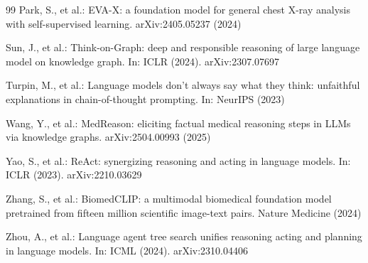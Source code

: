 \documentclass[runningheads]{llncs}
\begin{document}
\begin{thebibliography}{99}
Park, S., et al.:
EVA-X: a foundation model for general chest X-ray analysis with
self-supervised learning.
arXiv:2405.05237 (2024)

Sun, J., et al.:
Think-on-Graph: deep and responsible reasoning of large language model
on knowledge graph.
In: ICLR (2024). arXiv:2307.07697

Turpin, M., et al.:
Language models don't always say what they think: unfaithful explanations
in chain-of-thought prompting.
In: NeurIPS (2023)

Wang, Y., et al.:
MedReason: eliciting factual medical reasoning steps in LLMs via
knowledge graphs.
arXiv:2504.00993 (2025)

Yao, S., et al.:
ReAct: synergizing reasoning and acting in language models.
In: ICLR (2023). arXiv:2210.03629

Zhang, S., et al.:
BiomedCLIP: a multimodal biomedical foundation model pretrained from
fifteen million scientific image-text pairs.
Nature Medicine (2024)

Zhou, A., et al.:
Language agent tree search unifies reasoning acting and planning in
language models.
In: ICML (2024). arXiv:2310.04406

\end{thebibliography}
\end{document}
